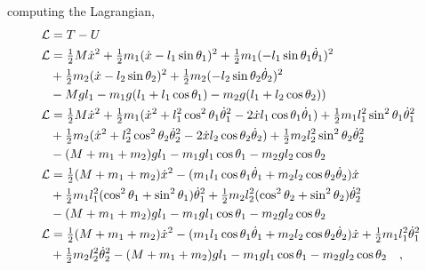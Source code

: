 computing the Lagrangian,
\begin{align}
  \cal{L} &= T - U   \nonumber \\ 
  \cal{L} &= \tfrac{1}{2} M \dot{x}^2 + \tfrac{1}{2} m_1 (\dot{x} - l_1 \sin \theta_1)^2  + \tfrac{1}{2} m_1 (-l_1 \sin \theta_1 \dot{\theta}_1)^2  \\
          &+ \tfrac{1}{2} m_2 (\dot{x} - l_2 \sin \theta_2)^2 + \tfrac{1}{2} m_2 (-l_2 \sin \theta_2 \dot{\theta}_2)^2 \\
          &- M g l_1 - m_1 g (l_1 + l_1 \cos \theta_1) - m_2 g (l_1 + l_2 \cos \theta_2)) \\
  \cal{L} &= \tfrac{1}{2} M \dot{x}^2 + \tfrac{1}{2} m_1 ( \dot{x}^2 + l_1^2 \cos ^2 \theta_1 \dot{\theta}_1^2 - 2 \dot{x} l_1 \cos \theta_1 \dot{\theta}_1 ) + \tfrac{1}{2} m_1 l_1^2 \sin ^2 \theta_1 \dot{\theta}_1^2 \\
          &+ \tfrac{1}{2} m_2 ( \dot{x}^2 + l_2^2 \cos ^2 \theta_2 \dot{\theta}_2^2 - 2 \dot{x} l_2 \cos \theta_2 \dot{\theta}_2 ) + \tfrac{1}{2} m_2 l_2^2 \sin ^2 \theta_2 \dot{\theta}_2^2 \\
          &-(M + m_1 + m_2) g l_1 - m_1 g l_1 \cos \theta_1 - m_2 g l_2 \cos \theta_2 \\
  \cal{L} &= \tfrac{1}{2} (M + m_1 + m_2) \dot{x}^2 - ( m_1 l_1 \cos \theta_1 \dot{\theta}_1 + m_2 l_2 \cos \theta_2 \dot{\theta}_2 ) \dot{x}  \\
          &+ \tfrac{1}{2} m_1 l_1^2 (\cos^2 \theta_1 + \sin^2 \theta_1)\dot{\theta}_1^2 + \tfrac{1}{2} m_2 l_2^2 (\cos^2 \theta_2 + \sin^2 \theta_2)\dot{\theta}_2^2 \\
          &- (M + m_1 + m_2)g l_1 - m_1 g l_1 \cos \theta_1 - m_2 g l_2 \cos \theta_2 \\
  \cal{L} &= \tfrac{1}{2} (M + m_1 + m_2) \dot{x}^2 - ( m_1 l_1 \cos \theta_1 \dot{\theta}_1 + m_2 l_2 \cos \theta_2 \dot{\theta}_2 ) \dot{x} + \tfrac{1}{2} m_1 l_1^2 \dot{\theta}_1^2 \\
          &+ \tfrac{1}{2} m_2 l_2^2 \dot{\theta}_2^2 - (M + m_1 + m_2)g l_1 - m_1 g l_1 \cos \theta_1 - m_2 g l_2 \cos \theta_2
  \ \ \ ,
  \label{eq:lagrangian}
\end{align}

